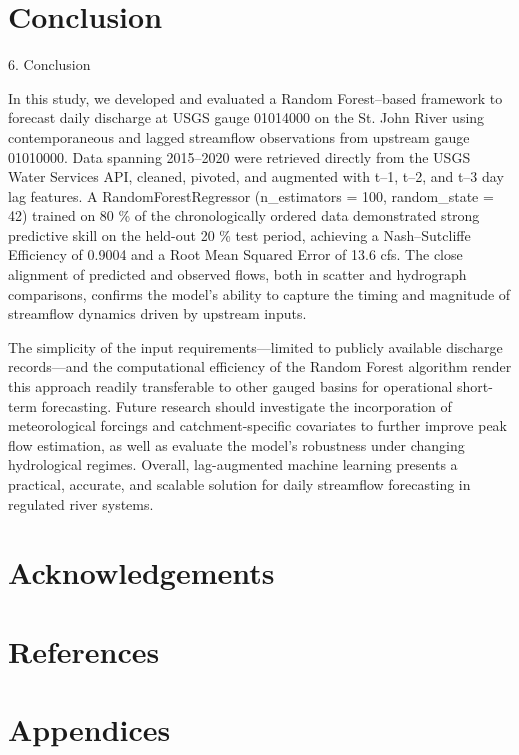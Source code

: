 \documentclass[preprint,12pt]{elsarticle}
\begin{document}
\section{Conclusion}

6. Conclusion

In this study, we developed and evaluated a Random Forest–based framework to forecast daily discharge at USGS gauge 01014000 on the St. John River using contemporaneous and lagged streamflow observations from upstream gauge 01010000. Data spanning 2015–2020 were retrieved directly from the USGS Water Services API, cleaned, pivoted, and augmented with t–1, t–2, and t–3 day lag features. A RandomForestRegressor (n\_estimators = 100, random\_state = 42) trained on 80 \% of the chronologically ordered data demonstrated strong predictive skill on the held-out 20 \% test period, achieving a Nash–Sutcliffe Efficiency of 0.9004 and a Root Mean Squared Error of 13.6 cfs. The close alignment of predicted and observed flows, both in scatter and hydrograph comparisons, confirms the model's ability to capture the timing and magnitude of streamflow dynamics driven by upstream inputs.

The simplicity of the input requirements—limited to publicly available discharge records—and the computational efficiency of the Random Forest algorithm render this approach readily transferable to other gauged basins for operational short-term forecasting. Future research should investigate the incorporation of meteorological forcings and catchment-specific covariates to further improve peak flow estimation, as well as evaluate the model's robustness under changing hydrological regimes. Overall, lag-augmented machine learning presents a practical, accurate, and scalable solution for daily streamflow forecasting in regulated river systems.


\section*{Acknowledgements}



\section*{References}



\section*{Appendices}




\end{document}

